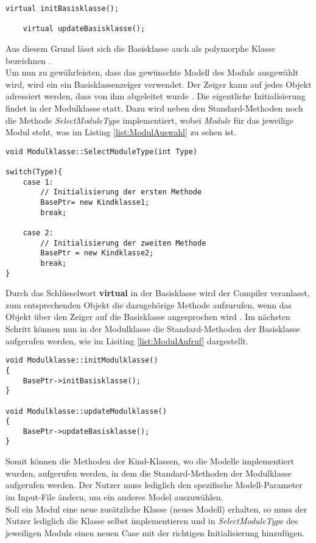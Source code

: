 \begin{lstlisting}[label = {list:Basisklasse}, caption = Aufbau des Header-Files der Basisklasse,captionpos=b]
	virtual initBasisklasse();

	virtual updateBasisklasse();
\end{lstlisting}
Aus diesem Grund lässt sich die Basisklasse auch als polymorphe Klasse bezeichnen \cite{Wolf.2014}. \\
Um nun zu gewährleisten, dass das gewünschte Modell des Moduls ausgewählt wird, wird ein ein Basisklassenzeiger verwendet. Der Zeiger kann auf jedes Objekt adressiert werden, dass von ihm abgeleitet wurde \cite{Wolf.2014}. Die eigentliche Initialisierung findet in der Modulklasse statt. Dazu wird neben den Standard-Methoden noch die Methode \textit{SelectModuleType} implementiert, wobei \textit{Module} für das jeweilige Modul steht, was im Listing \ref{list:ModulAuswahl} zu sehen ist.\\
\begin{lstlisting}[label = {list:ModulAuswahl}, caption = Basisklassenzeiger im Modul.cpp File ,captionpos=b]
void Modulklasse::SelectModuleType(int Type)

switch(Type){
	case 1:
		// Initialisierung der ersten Methode
		BasePtr= new Kindklasse1;
		break;
	
	case 2:
		// Initialisierung der zweiten Methode 
		BasePtr = new Kindklasse2;
		break;
}

\end{lstlisting}
Durch das Schlüsselwort \textbf{virtual} in der Basisklasse wird der Compiler veranlasst, zum entsprechenden Objekt die dazugehörige Methode aufzurufen, wenn das Objekt über den Zeiger auf die Basisklasse angesprochen wird \cite{Wolf.2014}. \newpage
Im nächsten Schritt können nun in der Modulklasse die Standard-Methoden der Basisklasse aufgerufen werden, wie im Lisiting \ref{list:ModulAufruf} dargestellt.
\begin{lstlisting}[label = {list:ModulAufruf}, caption = Aufruf der Standard-Methoden  im Modul.cpp File ,captionpos=b]
void Modulklasse::initModulklasse()
{
	BasePtr->initBasisklasse();
}

void Modulklasse::updateModulklasse()
{
	BasePtr->updateBasisklasse();
}
\end{lstlisting}

Somit können die Methoden der Kind-Klassen, wo die Modelle implementiert wurden, aufgerufen werden, in dem die Standard-Methoden der Modulklasse aufgerufen werden. Der Nutzer muss lediglich den spezifische Modell-Parameter im Input-File ändern, um ein anderes Model auszuwählen. \\Soll ein Modul eine neue zusätzliche Klasse (neues Modell) erhalten, so muss der Nutzer lediglich die Klasse selbst implementieren und in \textit{SelectModuleType} des jeweiligen Moduls einen neuen Case mit der richtigen Initialisierung hinzufügen.
\newpage
